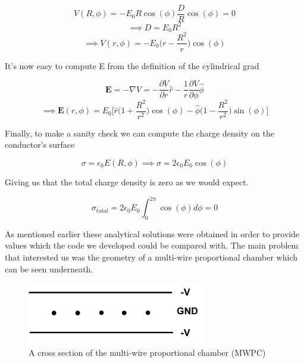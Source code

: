 \documentclass[a4paper]{article}
\renewcommand{\vec}[1]{\bm{#1}}
\begin{document}
\begin{equation}V(R,\phi) = -E_0R\cos(\phi) \frac{D}{R}\cos(\phi) = 0 \end{equation}
\begin{equation}\implies D = E_0R^2\end{equation}
\begin{equation}\implies \boxed{V(r,\phi) = -E_0 \bigg(r-\frac{R^2}{r}\bigg)\cos(\phi)}\end{equation}

It's now easy to compute E from the definition of the cylindrical grad

\begin{equation}\vec{E} = -\nabla V =  -\frac{\partial V}{\partial r} \hat{r} - \frac{1}{r}\frac{\partial V}{\partial \phi} \hat{\phi}\end{equation}
\begin{equation}\implies \boxed{\vec{E}(r,\phi) = E_0\bigg[\hat{r}\bigg(1+\frac{R^2}{r^2}\bigg)\cos(\phi) - \hat{\phi}\Big(1-\frac{R^2}{r^2}\Big)\sin(\phi)\bigg]}\end{equation}

Finally, to make a sanity check we can compute the charge density on the conductor's surface 

\begin{equation}\sigma = \epsilon_0E(R,\phi) \implies \boxed{\sigma=2\epsilon_0 E_0 \cos(\phi)}\end{equation}

Giving us that the total charge density is zero as we would expect.

\begin{equation}\sigma_{total} = 2\epsilon_0 E_0 \int_0^{2\pi} \cos(\phi) d\phi = 0\end{equation}


As mentioned earlier these analytical solutions were obtained in order to provide values which the code we developed could be compared with. The main problem that interested us was the geometry of a multi-wire proportional chamber which can be seen underneath. 


\begin{figure}[h]
\centering
\includegraphics[width=0.7\textwidth]{NobelProblem.png}
\caption{\label{fig:frog}A cross section of the multi-wire proportional chamber (MWPC)}
\end{figure}
\end{document}
